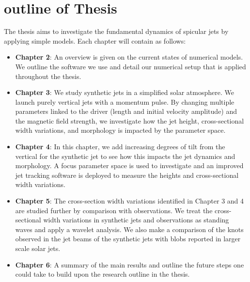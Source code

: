 \documentclass[12pt]{ociamthesis}
\begin{document}
\section{outline of Thesis}
\label{section:outline}
The thesis aims to investigate the fundamental dynamics of spicular jets by applying simple models. Each chapter will contain as follows:
\begin{itemize}
    \item {\bf{Chapter 2}}: An overview is given on the current states of numerical models. We outline the software we use and detail our numerical setup that is applied throughout the thesis.
    \item {\bf{Chapter 3}}: We study synthetic jets in a simplified solar atmosphere. We launch purely vertical jets with a momentum pulse. By changing multiple parameters linked to the driver (length and initial velocity amplitude) and the magnetic field strength, we investigate how the jet height, cross-sectional width variations, and morphology is impacted by the parameter space.
    \item {\bf{Chapter 4}}: In this chapter, we add increasing degrees of tilt from the vertical for the synthetic jet to see how this impacts the jet dynamics and morphology. A focus parameter space is used to investigate and an improved jet tracking software is deployed to measure the heights and cross-sectional width variations.     
    \item {\bf{Chapter 5}}: The cross-section width variations identified in Chapter 3 and 4 are studied further by comparison with observations. We treat the cross-sectional width variations in synthetic jets and observations as standing waves and apply a wavelet analysis. We also make a comparison of the knots observed in the jet beams of the synthetic jets with blobs reported in larger scale solar jets.   
    \item {\bf{Chapter 6}}: A summary of the main results and outline the future steps one could take to build upon the research outline in the thesis.  
\end{itemize}
\end{document}
